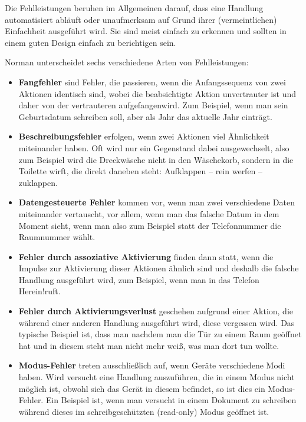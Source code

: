 \documentclass[parskip,headsepline, headtopline, %
footsepline, oneside, 12pt, headings=small]{scrreprt}
\begin{document}
Die Fehlleistungen beruhen im Allgemeinen darauf, dass eine Handlung automatisiert abläuft oder unaufmerksam auf Grund ihrer (vermeintlichen) Einfachheit ausgeführt wird. Sie sind meist einfach zu erkennen und sollten in einem guten Design einfach zu berichtigen sein.

Norman unterscheidet sechs verschiedene Arten von Fehlleistungen\cite[S. 107]{don}:

\begin{itemize}
\item \textbf{Fangfehler} sind Fehler, die passieren, wenn die Anfangssequenz von zwei Aktionen identisch sind, wobei die beabsichtigte Aktion unvertrauter ist und daher von der vertrauteren \glqq aufgefangen\grqq wird. Zum Beispiel, wenn man sein Geburtsdatum schreiben soll, aber als Jahr das aktuelle Jahr einträgt.
\item \textbf{Beschreibungsfehler} erfolgen, wenn zwei Aktionen viel Ähnlichkeit miteinander haben. Oft wird nur ein Gegenstand dabei ausgewechselt, also zum Beispiel wird die Dreckwäsche nicht in den Wäschekorb, sondern in die Toilette wirft, die direkt daneben steht: Aufklappen -- rein werfen -- zuklappen.
\item \textbf{Datengesteuerte Fehler} kommen vor, wenn man zwei verschiedene Daten miteinander vertauscht, vor allem, wenn man das falsche Datum in dem Moment sieht, wenn man also zum Beispiel statt der Telefonnummer die Raumnummer wählt.
\item \textbf{Fehler durch assoziative Aktivierung} finden dann statt, wenn die Impulse zur Aktivierung dieser Aktionen ähnlich sind und deshalb die falsche Handlung ausgeführt wird, zum Beispiel, wenn man in das Telefon \glqq Herein!\grqq  ruft.
\item \textbf{Fehler durch Aktivierungsverlust} geschehen aufgrund einer Aktion, die während einer anderen Handlung ausgeführt wird, diese vergessen wird. Das typische Beispiel ist, dass man nachdem man die Tür zu einem Raum geöffnet hat und in diesem steht man nicht mehr weiß, was man dort tun wollte.
\item \textbf{Modus-Fehler} treten ausschließlich auf, wenn Geräte verschiedene Modi haben. Wird versucht eine Handlung auszuführen, die in einem Modus nicht möglich ist, obwohl sich das Gerät in diesem befindet, so ist dies ein Modus-Fehler. Ein Beispiel ist, wenn man versucht in einem Dokument zu schreiben während dieses im schreibgeschützten (read-only) Modus geöffnet ist.
\end{itemize}
\end{document}
